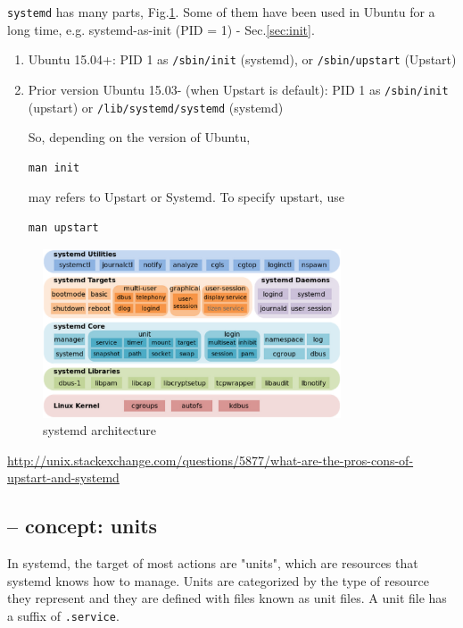\verb!systemd! has many parts, Fig.\ref{fig:systemd}. Some of them have been
used in Ubuntu for a long time, e.g. systemd-as-init (PID = 1)
- Sec.\ref{sec:init}.
\begin{enumerate}
  
  \item Ubuntu 15.04+: PID 1 as \verb!/sbin/init! (systemd), or
  \verb!/sbin/upstart! (Upstart)
  
  \item Prior version Ubuntu 15.03- (when Upstart is default): PID 1 as
  \verb!/sbin/init! (upstart) or \verb!/lib/systemd/systemd! (systemd)

So, depending on the version of Ubuntu, 
\begin{verbatim}
man init
\end{verbatim}
may refers to Upstart or Systemd. To specify upstart, use
\begin{verbatim}
man upstart
\end{verbatim} 

\end{enumerate} 

 
\begin{figure}[hbt]
  \centerline{\includegraphics[height=5cm,
    angle=0]{./images/systemd.eps}}
  \caption{systemd architecture}
  \label{fig:systemd}
\end{figure}

\url{http://unix.stackexchange.com/questions/5877/what-are-the-pros-cons-of-upstart-and-systemd}

\subsection{-- concept: units}
\label{sec:systemd-unit-file}

In systemd, the target of most actions are "units", which are resources that
systemd knows how to manage. Units are categorized by the type of resource they
represent and they are defined with files known as unit files.  A unit file has
a suffix of \verb!.service!. 

